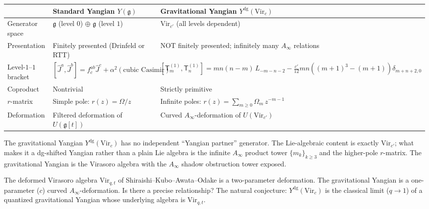 \documentclass[11pt]{article}
\newcommand{\fg}{\mathfrak{g}}
\begin{document}
\begin{center}
\renewcommand{\arraystretch}{1.4}
\small
\begin{tabular}{@{}p{3.2cm}p{5.4cm}p{5.4cm}@{}}
\toprule
& \textbf{Standard Yangian $Y(\fg)$}
& \textbf{Gravitational Yangian $Y^{\mathrm{dg}}(\mathrm{Vir}_c)$}
\\
\midrule
Generator space
& $\fg$ (level $0$) $\oplus$ $\fg$ (level $1$)
& $\mathrm{Vir}_{c'}$ (all levels dependent)
\\
Presentation
& Finitely presented (Drinfeld or RTT)
& NOT finitely presented; infinitely many $A_\infty$ relations
\\
Level-$1$--$1$ bracket
& $[\hat{J}^a, \hat{J}^b] = f^{ab}_c\hat{J}^c
  + \alpha^2(\text{cubic Casimir})$
& $[\mathsf{T}_m^{(1)}, \mathsf{T}_n^{(1)}]
  = mn(n{-}m)\,L_{-m-n-2}
  - \frac{c'}{12}mn((m{+}1)^3{-}(m{+}1))\delta_{m+n+2,0}$
\\
Coproduct
& Nontrivial
& Strictly primitive
\\
$r$-matrix
& Simple pole: $r(z) = \Omega/z$
& Infinite poles: $r(z) = \sum_{m \ge 0}\Omega_m\,z^{-m-1}$
\\
Deformation
& Filtered deformation of $U(\fg[t])$
& Curved $A_\infty$-deformation of $U(\mathrm{Vir}_{c'})$
\\
\bottomrule
\end{tabular}
\end{center}

\begin{observation}
The gravitational Yangian $Y^{\mathrm{dg}}(\mathrm{Vir}_c)$ has no
independent ``Yangian partner'' generator.  The Lie-algebraic content
is exactly $\mathrm{Vir}_{c'}$; what makes it a dg-shifted Yangian
rather than a plain Lie algebra is the infinite $A_\infty$ product
tower $\{m_k\}_{k \ge 3}$ and the higher-pole $r$-matrix.  The
gravitational Yangian is the Virasoro algebra with the $A_\infty$
shadow obstruction tower exposed.
\end{observation}

\begin{question}
The deformed Virasoro algebra $\mathrm{Vir}_{q,t}$ of
Shiraishi--Kubo--Awata--Odake is a two-parameter deformation.
The gravitational Yangian is a one-parameter ($c$) curved
$A_\infty$-deformation.  Is there a precise relationship?  The
natural conjecture: $Y^{\mathrm{dg}}(\mathrm{Vir}_c)$ is the
classical limit ($q \to 1$) of a quantized gravitational Yangian
whose underlying algebra is $\mathrm{Vir}_{q,t}$.
\end{question}
\end{document}
